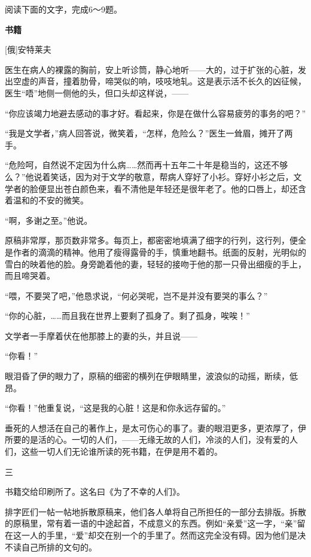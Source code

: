 \documentclass[11pt,a4paper]{ctexart}
\begin{document}
阅读下面的文字，完成6～9题。

\begin{center}{\bfseries 书籍}\par\vspace{0.15em}[俄]安特莱夫\end{center}

\begin{materialtext}
医生在病人的裸露的胸前，安上听诊筒，静心地听——大的，过于扩张的心脏，发出空虚的声音，撞着肋骨，啼哭似的响，吱吱地轧。这是表示活不长久的凶征候，医生“唔”地侧一侧他的头，但口头却这样说，——

“你应该竭力地避去感动的事才好。看起来，你是在做什么容易疲劳的事务的吧？”

“我是文学者，”病人回答说，微笑着，“怎样，危险么？”医生一耸眉，摊开了两手。

“危险呵，自然说不定因为什么病……然而再十五年二十年是稳当的，这还不够么？”他说着笑话，因为对于文学的敬意，帮病人穿好了小衫。穿好小衫之后，文学者的脸便显出苍白颜色来，看不清他是年轻还是很年老了。他的口唇上，却还含着温和的不安的微笑。

“啊，多谢之至。”他说。

原稿非常厚，那页数非常多。每页上，都密密地填满了细字的行列，这行列，便全是作者的滴滴的精神。他用了瘦得露骨的手，慎重地翻书。纸面的反射，光明似的雪白的映着他的脸。身旁跪着他的妻，轻轻的接吻于他的那一只骨出细瘦的手上，而且啼哭着。

“喂，不要哭了吧，”他恳求说，“何必哭呢，岂不是并没有要哭的事么？”

“你的心脏，……而且我在世界上要剩了孤身了。剩了孤身，唉唉！”

文学者一手摩着伏在他那膝上的妻的头，并且说——

“你看！”

眼泪昏了伊的眼力了，原稿的细密的横列在伊眼睛里，波浪似的动摇，断续，低昂。

“你看！”他重复说，“这是我的心脏！这是和你永远存留的。”

垂死的人想活在自己的著作上，是太可伤心的事了。妻的眼泪更多，更浓厚了，伊所要的是活的心。一切的人们，——无缘无故的人们，冷淡的人们，没有爱的人们，这些一切人们无论谁所读的死书籍，在伊是用不着的。

\begin{center}三\end{center}

书籍交给印刷所了。这名曰《为了不幸的人们》。

排字匠们一帖一帖地拆散原稿来，他们各人单将自己所担任的一部分去排版。拆散的原稿里，常有着一语的中途起首，不成意义的东西。例如“亲爱”这一字，“亲”留在这一人的手里，“爱”却交在别一个的手里了。然而这完全没有碍。因为他们是决不读自己所排的文句的。


\end{materialtext}
\end{document}
